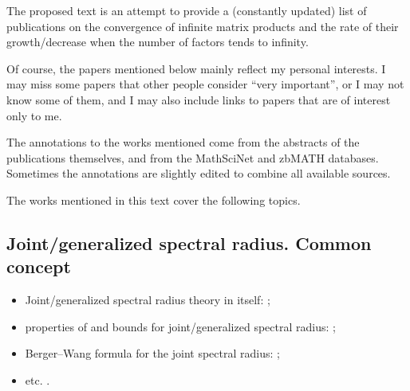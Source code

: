 %
The proposed text is an attempt to provide a (constantly updated) list of publications on the convergence of infinite matrix products and the rate of their growth/decrease when the number of factors tends to infinity.

Of course, the papers mentioned below mainly reflect my personal interests. I may miss some papers that other people consider ``very important'', or I may not know some of them, and I may also include links to papers that are of interest only to me.

The annotations to the works mentioned come from the abstracts of the publications themselves, and from the MathSciNet and zbMATH databases. Sometimes the annotations are slightly edited to combine all available sources.

The works mentioned in this text cover the following topics.

\subsection*{Joint/generalized spectral radius. Common concept}
\begin{itemize}
\item Joint/generalized spectral radius theory in itself: \cite{AhmPar:CDC12, Bar:CDC05, BKPW:LAA08, Blondel:LAA08, Bochi15, Breuillard:ArXiv21, Cicone:ArXiv15, CMS:LAA21, Czornik:LAA05, Els:LAA95, GugZen:LNM14, Jungers:09, Jungers:LNCS13, Morris:LAA17, MorSid:JEMS13, OgurMart:LAA14, PW:LAA08, PWB:CDC05, Prot:FPM96:e, Prot:IZV97:e, Prot:FU98, RotaStr:IM60, ShihWP:LAA97, ShulTur:JFA00, KisShulTur:20, KisShulTur:JMS22, ShulTur:ArXiv08, Strang03, Theys:PhD05, XuXiao:AJIFAC11, MolReif:LAA14, Moller15, MP:DCDCA18};
\item properties of and bounds for joint/generalized spectral radius: \cite{Alpin:MZ10, Breuillard:ArXiv21, CJ:IJAMCS06, CJN:AISC15, Gil:UJMA19, GS:MCRF20, HStr:LASP92, Koz:DEDS10, Koz:LAA10, Maesumi:TIC95, Maesumi:LAA96, Morris:ADVM10, Peperko:LAA12, Wirth:MTNS04, Wirth:LAA05, XuAci:IEEETAC20, Zhou:AMC06};
\item Berger--Wang formula for the joint spectral radius: \cite{BF:ArXiv18, Breuillard:ArXiv21, Koz:LAA14, Morris:JFA12, Oregon-Reyes:JEPM20};
\item etc. \cite{Bui:ArXiv21, GugZen:LAA12, Koz:LAA09, Oreg-Reyes:MastThes18, Pascoe:IJM21}.
\end{itemize}


